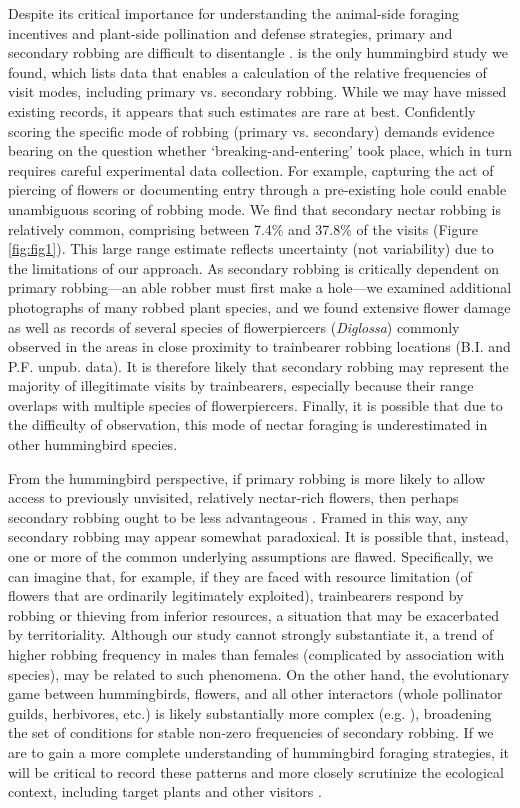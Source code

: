 \documentclass[fleqn,10pt,lineno]{wlpeerj}
\begin{document}
Despite its critical importance for understanding the animal-side foraging incentives and plant-side pollination and defense strategies,
primary and secondary robbing are difficult to disentangle \citep{vogt2006,boehm2018}. 
\citet{snow1980} is the only hummingbird study we found, which lists data that enables a calculation of the relative frequencies of visit modes, including primary vs. secondary robbing. 
While we may have missed existing records, it appears that such estimates are rare at best.
Confidently scoring the specific mode of robbing (primary vs. secondary) demands evidence bearing on the question whether `breaking-and-entering' took place, which in turn requires careful experimental data collection.
For example, capturing the act of piercing of flowers or documenting entry through a pre-existing hole could enable unambiguous scoring of robbing mode.
We find that secondary nectar robbing is relatively common, comprising between 7.4\% and 37.8\% of the visits (Figure \ref{fig:fig1}).
This large range estimate reflects uncertainty (not variability) due to the limitations of our approach.
As secondary robbing is critically dependent on primary robbing---an able robber must first make a hole---we examined additional photographs of many robbed plant species, and we found extensive flower damage as well as records of several species of flowerpiercers (\textit{Diglossa}) commonly observed in the areas in close proximity to trainbearer robbing locations (B.I. and P.F. unpub. data).
It is therefore likely that secondary robbing may represent the majority of illegitimate visits by trainbearers, especially because their range overlaps with multiple species of flowerpiercers. 
Finally, it is possible that due to the difficulty of observation, this mode of nectar foraging is underestimated in other hummingbird species. 

%
%
From the hummingbird perspective, if primary robbing is more likely to allow access to previously unvisited, relatively nectar-rich flowers, then perhaps secondary robbing ought to be less advantageous \citep{irwin2010}.  
Framed in this way, any secondary robbing may appear somewhat paradoxical. 
It is possible that, instead, one or more of the common underlying assumptions are flawed. 
Specifically, we can imagine that, for example, if they are faced with resource limitation (of flowers that are ordinarily legitimately exploited), trainbearers respond by robbing or thieving from inferior resources, a situation that may be exacerbated by territoriality. 
Although our study cannot strongly substantiate it, a trend of higher robbing frequency in males than females (complicated by association with species), may be related to such phenomena.
On the other hand, the evolutionary game between hummingbirds, flowers, and all other interactors (whole pollinator guilds, herbivores, etc.) is likely substantially more complex (e.g. \citealt{maloof2000}), broadening the set of conditions for stable non-zero frequencies of secondary robbing.
If we are to gain a more complete understanding of hummingbird foraging strategies, it will be critical to record these patterns and more closely scrutinize the ecological context, including target plants and other visitors \citep{richman2017}.
\end{document}
